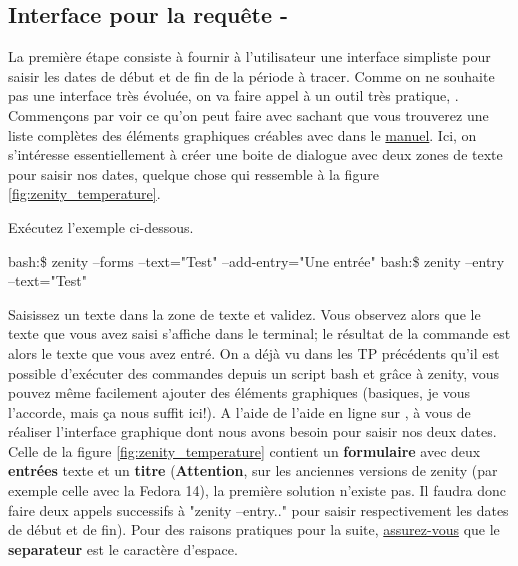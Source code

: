\subsection{Interface pour la requête - \zenity}

La première étape consiste à fournir à l'utilisateur une interface simpliste pour saisir les dates de début et de fin de la période à tracer. Comme on ne souhaite pas une interface très évoluée, on va faire appel à un outil très pratique, \zenity. Commençons par voir ce qu'on peut faire avec \zenity sachant que vous trouverez une liste complètes des éléments graphiques créables avec \zenity dans le \href{https://help.gnome.org/users/zenity/stable/}{manuel}. Ici, on s'intéresse essentiellement à créer une boite de dialogue avec deux zones de texte pour saisir nos dates, quelque chose qui ressemble à la figure \ref{fig:zenity_temperature}.\\


Exécutez l'exemple ci-dessous. 
\begin{exempleResultat}
bash:\$ zenity --forms --text="Test" --add-entry="Une entrée"
bash:\$ zenity --entry --text="Test"
\end{exempleResultat}
Saisissez un texte dans la zone de texte et validez. Vous observez alors que le texte que vous avez saisi s'affiche dans le terminal; le résultat de la commande est alors le texte que vous avez entré. On a déjà vu dans les TP précédents qu'il est possible d'exécuter des commandes depuis un script bash et grâce à zenity, vous pouvez même facilement ajouter des éléments graphiques (basiques, je vous l'accorde, mais ça nous suffit ici!). A l'aide de l'aide en ligne sur \zenity, à vous de réaliser l'interface graphique dont nous avons besoin pour saisir nos deux dates. Celle de la figure \ref{fig:zenity_temperature} contient un \textbf{formulaire} avec deux \textbf{entrées} texte et un \textbf{titre} (\textbf{Attention}, sur les anciennes versions de zenity (par exemple celle avec la Fedora 14), la première solution n'existe pas. Il faudra donc faire deux appels successifs à "zenity --entry.." pour saisir respectivement les dates de début et de fin). Pour des raisons pratiques pour la suite, \underline{assurez-vous} que le \textbf{separateur} est le caractère d'espace.\\

